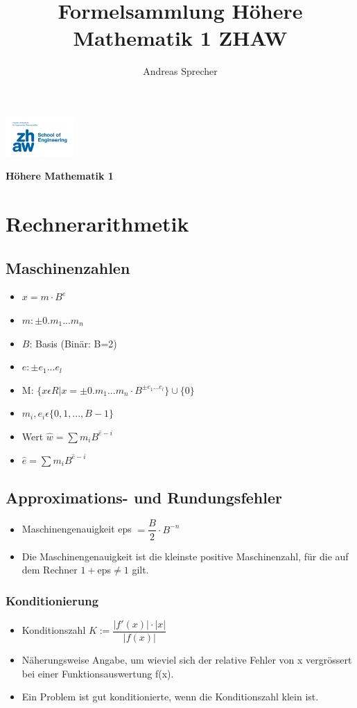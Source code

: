 \documentclass[6pt,a4paper]{scrartcl}
\title{Formelsammlung Höhere Mathematik 1 ZHAW}
\author{Andreas Sprecher}
\renewcommand{\emph}[1]{\textbf{#1}}                                                            %
\begin{document}
\begin{multicols*}{4}
\setlength{\columnseprule}{0.4pt}
    \parbox{3cm}{
        \includegraphics[height=1.5cm]{./img/Logo.jpeg}
    }
    \parbox{4cm}{
        \emph{\Large{Höhere Mathematik 1}}
    }
    \vspace{-2mm} 

	\section{Rechnerarithmetik}
		\subsection{Maschinenzahlen}
			\begin{itemize}\itemsep0pt				
				\item $x = m \cdot B^{e}$
				\item $m: \pm 0.m_{1}...m_{n}$
				\item $B$: Basis (Binär: B=2)
				\item $e: \pm e_{1}...e_{l}$
				\item M: $\{x\epsilon R | x = \pm 0.m_{1}...m_{n}\cdot B^{\pm e_{1}...e_{l}}\} \cup \{0\}$
				\item $m_{i}, e_{i}\epsilon\{0,1,..., B-1\}$	
				\item Wert $\hat{w} = \sum m_{i}B^{\hat{e}-i}$
				\item $\hat{e} = \sum m_{i}B^{\hat{e}-i}$
			\end{itemize}
		\subsection{Approximations- und Rundungsfehler}
			\begin{itemize}\itemsep0pt	
				\item Maschinengenauigkeit eps $=\dfrac{B}{2}\cdot B^{-n}$
				\item Die Maschinengenauigkeit ist die kleinste positive Maschinenzahl, für die auf dem Rechner $1 + $eps$  \neq 1$ gilt.
			\end{itemize}		
		
			\subsubsection{Konditionierung}
    				\begin{itemize}\itemsep0pt			
    					\item Konditionszahl $K:= \dfrac{|f'(x)|\cdot |x|}{|f(x)|} $
    					\item Näherungsweise Angabe, um wieviel sich der relative Fehler von x vergrössert bei einer Funktionsauswertung f(x).
    					\item Ein Problem ist gut konditionierte, wenn die Konditionszahl klein ist.


\end{itemize}
\end{multicols*}
\end{document}
